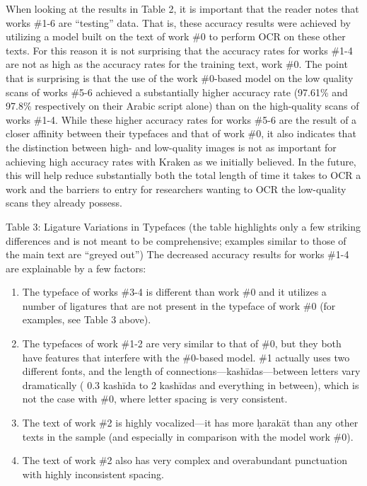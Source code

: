 When looking at the results in Table 2, it is important that the reader notes
that works \#1-6 are “testing” data. That is, these accuracy results were
achieved by utilizing a model built on the text of work \#0 to perform OCR on
these other texts. For this reason it is not surprising that the accuracy rates
for works \#1-4 are not as high as the accuracy rates for the training text,
work \#0. The point that is surprising is that the use of the work \#0-based
model on the low quality scans of works \#5-6 achieved a substantially higher
accuracy rate (97.61\% and 97.8\% respectively on their Arabic script alone) than
on the high-quality scans of works \#1-4. While these higher accuracy rates for
works \#5-6 are the result of a closer affinity between their typefaces and that
of work \#0, it also indicates that the distinction between high-  and
low-quality images is not as important for achieving high accuracy rates with
Kraken as we initially believed. In the future, this will help reduce
substantially both the total length of time it takes to OCR a work and the
barriers to entry for researchers wanting to OCR the low-quality scans they
already possess.

Table 3: Ligature Variations in Typefaces
(the table highlights only a few striking differences and is not meant to be comprehensive;
examples similar to those of the main text are “greyed out”)  
The decreased accuracy results for works \#1-4 are explainable by a few factors:

\begin{enumerate}
	\item The typeface of works \#3-4 is different than work \#0 and it utilizes a number of ligatures that are not present in the typeface of work \#0 (for examples, see Table 3 above). 
	\item The typefaces of work \#1-2 are very similar to that of \#0, but they both have features that interfere with the \#0-based model. \#1 actually uses two different fonts, and the length of connections—kashīdas—between letters vary dramatically ( 0.3 kashīda to 2 kashīdas and everything in between), which is not the case with \#0, where letter spacing is very consistent. 
	\item The text of work \#2 is highly vocalized—it has more ḥarakāt than any other texts in the sample (and especially in comparison with the model work \#0).
	\item The text of work \#2 also has very complex and overabundant punctuation with highly inconsistent spacing. 
\end{enumerate}

